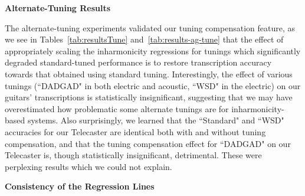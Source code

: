 \documentclass[12pt]{cmuthesis}
\begin{document}
\textbf{Alternate-Tuning Results}

The alternate-tuning experiments validated our tuning compensation feature, as we see in Tables~\ref{tab:resultsTune} and~\ref{tab:results-ag-tune} that the effect of appropriately scaling the inharmonicity regressions for tunings which significantly degraded standard-tuned performance is to restore transcription accuracy towards that obtained using standard tuning. Interestingly, the effect of various tunings (``DADGAD" in both electric and acoustic, ``WSD" in the electric) on our guitars' transcriptions is statistically insignificant, suggesting that we may have overestimated how problematic some alternate tunings are for inharmonicity-based systems. Also surprisingly, we learned that the ``Standard" and ``WSD" accuracies for our Telecaster are identical both with and without tuning compensation, and that the tuning compensation effect for ``DADGAD" on our Telecaster is, though statistically insignificant, detrimental. These were perplexing results which we could not explain.


\textbf{Consistency of the Regression Lines} 
\end{document}
